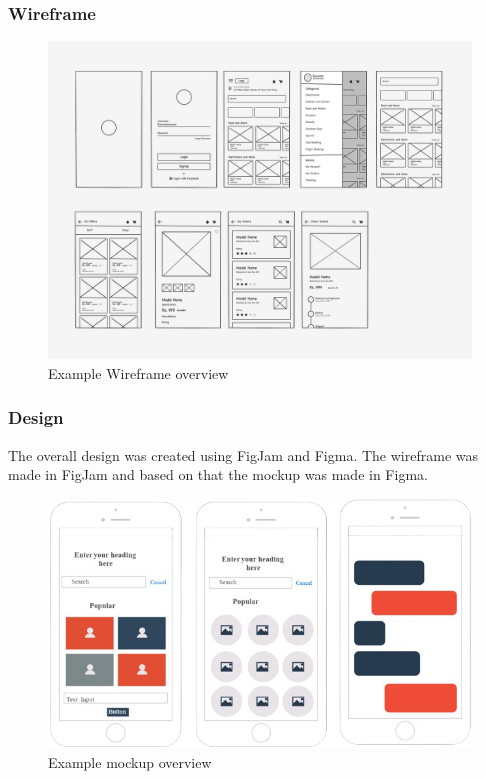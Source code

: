 \documentclass[12pt,a4paper]{article}
\begin{document}
\begin{spacing}{1.5}
    \subsubsection{Wireframe}
    \begin{figure}[h]
        \centering
        \includegraphics[width=1\linewidth]{assets/wireframe-example.png}
        \caption{Example Wireframe overview}
    \end{figure}
    \FloatBarrier

    \newpage
    \subsubsection{Design}
    The overall design was created using FigJam and Figma. The wireframe was made
    in FigJam and based on that the mockup was made in Figma.

    \begin{figure}[H]
        \centering
        \includegraphics[width=1\linewidth]{assets/mockup-example.png}
        \caption{Example mockup overview}
    \end{figure}
    \FloatBarrier


\end{spacing}
\end{document}
